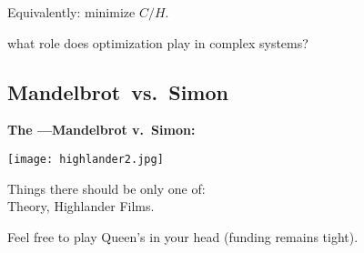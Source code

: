       Equivalently: minimize $C/H$.
     
       what role does optimization play in complex systems?
    
  


\subsection{Mandelbrot\ vs.\ Simon}

  \textbf{The ---Mandelbrot v.\ Simon:}

  \textbf{}
    \texttt{[image: highlander2.jpg]}
    
    
      Things there should be only one of:\\ 
      Theory, Highlander Films.
    
      Feel free to play Queen's 
      in your head
      (funding remains tight).
    
  


